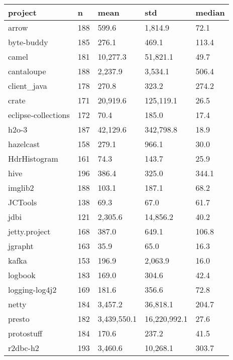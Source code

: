 \begin{tabular}{lllll}
\toprule
            project &     n &        mean &          std & median \\
\midrule
              arrow &   188 &       599.6 &      1,814.9 &   72.1 \\
         byte-buddy &   185 &       276.1 &        469.1 &  113.4 \\
              camel &   181 &    10,277.3 &     51,821.1 &   49.7 \\
         cantaloupe &   188 &     2,237.9 &      3,534.1 &  506.4 \\
        client\_java &   178 &       270.8 &        323.2 &  274.2 \\
              crate &   171 &    20,919.6 &    125,119.1 &   26.5 \\
eclipse-collections &   172 &        70.4 &        185.0 &   17.4 \\
              h2o-3 &   187 &    42,129.6 &    342,798.8 &   18.9 \\
          hazelcast &   158 &       279.1 &        966.1 &   30.0 \\
       HdrHistogram &   161 &        74.3 &        143.7 &   25.9 \\
               hive &   196 &       386.4 &        325.0 &  344.1 \\
            imglib2 &   188 &       103.1 &        187.1 &   68.2 \\
            JCTools &   138 &        69.3 &         67.0 &   61.7 \\
               jdbi &   121 &     2,305.6 &     14,856.2 &   40.2 \\
      jetty.project &   168 &       387.0 &        649.1 &  106.8 \\
            jgrapht &   163 &        35.9 &         65.0 &   16.3 \\
              kafka &   153 &       196.9 &      2,063.9 &   16.0 \\
            logbook &   183 &       169.0 &        304.6 &   42.4 \\
     logging-log4j2 &   169 &       181.6 &        356.6 &   72.8 \\
              netty &   184 &     3,457.2 &     36,818.1 &  204.7 \\
             presto &   182 & 3,439,550.1 & 16,220,992.1 &   27.6 \\
         protostuff &   184 &       170.6 &        237.2 &   41.5 \\
           r2dbc-h2 &   193 &     3,460.6 &     10,268.1 &  303.7 \\

\end{tabular}
